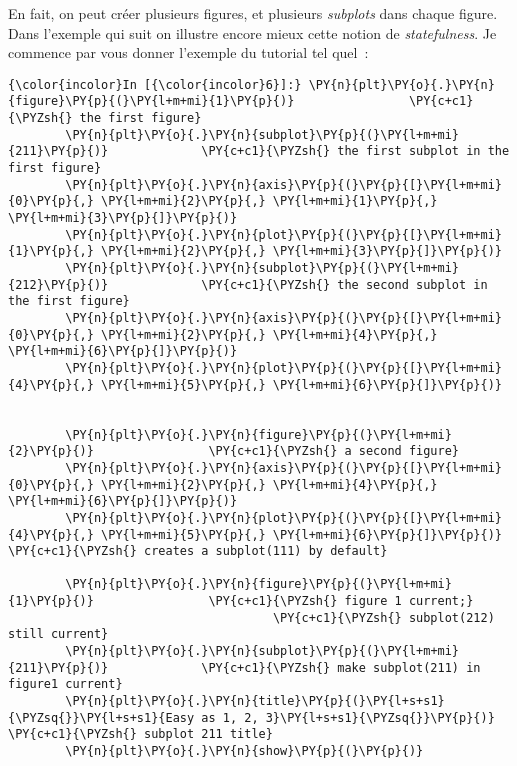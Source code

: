     En fait, on peut créer plusieurs figures, et plusieurs \emph{subplots}
dans chaque figure. Dans l'exemple qui suit on illustre encore mieux
cette notion de \emph{statefulness}. Je commence par vous donner
l'exemple du tutorial tel quel~:

    \begin{Verbatim}[commandchars=\\\{\},frame=single,framerule=0.3mm,rulecolor=\color{cellframecolor}]
{\color{incolor}In [{\color{incolor}6}]:} \PY{n}{plt}\PY{o}{.}\PY{n}{figure}\PY{p}{(}\PY{l+m+mi}{1}\PY{p}{)}                \PY{c+c1}{\PYZsh{} the first figure}
        \PY{n}{plt}\PY{o}{.}\PY{n}{subplot}\PY{p}{(}\PY{l+m+mi}{211}\PY{p}{)}             \PY{c+c1}{\PYZsh{} the first subplot in the first figure}
        \PY{n}{plt}\PY{o}{.}\PY{n}{axis}\PY{p}{(}\PY{p}{[}\PY{l+m+mi}{0}\PY{p}{,} \PY{l+m+mi}{2}\PY{p}{,} \PY{l+m+mi}{1}\PY{p}{,} \PY{l+m+mi}{3}\PY{p}{]}\PY{p}{)}
        \PY{n}{plt}\PY{o}{.}\PY{n}{plot}\PY{p}{(}\PY{p}{[}\PY{l+m+mi}{1}\PY{p}{,} \PY{l+m+mi}{2}\PY{p}{,} \PY{l+m+mi}{3}\PY{p}{]}\PY{p}{)}
        \PY{n}{plt}\PY{o}{.}\PY{n}{subplot}\PY{p}{(}\PY{l+m+mi}{212}\PY{p}{)}             \PY{c+c1}{\PYZsh{} the second subplot in the first figure}
        \PY{n}{plt}\PY{o}{.}\PY{n}{axis}\PY{p}{(}\PY{p}{[}\PY{l+m+mi}{0}\PY{p}{,} \PY{l+m+mi}{2}\PY{p}{,} \PY{l+m+mi}{4}\PY{p}{,} \PY{l+m+mi}{6}\PY{p}{]}\PY{p}{)}
        \PY{n}{plt}\PY{o}{.}\PY{n}{plot}\PY{p}{(}\PY{p}{[}\PY{l+m+mi}{4}\PY{p}{,} \PY{l+m+mi}{5}\PY{p}{,} \PY{l+m+mi}{6}\PY{p}{]}\PY{p}{)}
        
        
        \PY{n}{plt}\PY{o}{.}\PY{n}{figure}\PY{p}{(}\PY{l+m+mi}{2}\PY{p}{)}                \PY{c+c1}{\PYZsh{} a second figure}
        \PY{n}{plt}\PY{o}{.}\PY{n}{axis}\PY{p}{(}\PY{p}{[}\PY{l+m+mi}{0}\PY{p}{,} \PY{l+m+mi}{2}\PY{p}{,} \PY{l+m+mi}{4}\PY{p}{,} \PY{l+m+mi}{6}\PY{p}{]}\PY{p}{)}
        \PY{n}{plt}\PY{o}{.}\PY{n}{plot}\PY{p}{(}\PY{p}{[}\PY{l+m+mi}{4}\PY{p}{,} \PY{l+m+mi}{5}\PY{p}{,} \PY{l+m+mi}{6}\PY{p}{]}\PY{p}{)}          \PY{c+c1}{\PYZsh{} creates a subplot(111) by default}
        
        \PY{n}{plt}\PY{o}{.}\PY{n}{figure}\PY{p}{(}\PY{l+m+mi}{1}\PY{p}{)}                \PY{c+c1}{\PYZsh{} figure 1 current;}
                                     \PY{c+c1}{\PYZsh{} subplot(212) still current}
        \PY{n}{plt}\PY{o}{.}\PY{n}{subplot}\PY{p}{(}\PY{l+m+mi}{211}\PY{p}{)}             \PY{c+c1}{\PYZsh{} make subplot(211) in figure1 current}
        \PY{n}{plt}\PY{o}{.}\PY{n}{title}\PY{p}{(}\PY{l+s+s1}{\PYZsq{}}\PY{l+s+s1}{Easy as 1, 2, 3}\PY{l+s+s1}{\PYZsq{}}\PY{p}{)} \PY{c+c1}{\PYZsh{} subplot 211 title}
        \PY{n}{plt}\PY{o}{.}\PY{n}{show}\PY{p}{(}\PY{p}{)}
\end{Verbatim}


